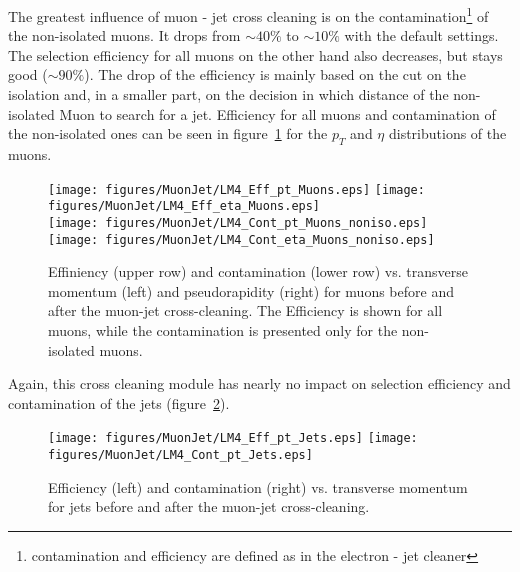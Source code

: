 \documentclass{cmspaper}
\begin{document}
The greatest influence of muon - jet cross cleaning is on the contamination\footnote{contamination and efficiency are defined as in the electron - jet cleaner} of
the non-isolated muons. It drops from \(\sim 40 \%\) to \(\sim 10 \%\) with the default settings. The
selection efficiency for all muons on the other hand also decreases, but stays good (\(\sim
90\%\)). The drop of the efficiency is mainly based on the cut on the isolation and, in a smaller part, on the decision in which distance of the non-isolated Muon to search for a jet. Efficiency for all muons and contamination of the non-isolated ones can be seen in figure~\ref{fig:effCont_muon_MuonJet} for the \(p_T\)
and \(\eta\) distributions of the muons. 

\begin{figure}[hb]
\begin{center}
    \texttt{[image: figures/MuonJet/LM4\_Eff\_pt\_Muons.eps]}
    \texttt{[image: figures/MuonJet/LM4\_Eff\_eta\_Muons.eps]}\\
    \texttt{[image: figures/MuonJet/LM4\_Cont\_pt\_Muons\_noniso.eps]}
    \texttt{[image: figures/MuonJet/LM4\_Cont\_eta\_Muons\_noniso.eps]}
    \caption{Effiniency (upper row) and contamination (lower row) vs. transverse
    momentum (left) and pseudorapidity (right) for muons before and after the
    muon-jet cross-cleaning. The Efficiency is shown for all muons, while the contamination is presented only for the non-isolated muons.}
\label{fig:effCont_muon_MuonJet}
\end{center}
\end{figure}

Again, this cross cleaning module has nearly no impact on selection efficiency
and contamination of the jets (figure~\ref{fig:effCont_Jets_MuonJet}).

\begin{figure}[hb]
\begin{center}
    \texttt{[image: figures/MuonJet/LM4\_Eff\_pt\_Jets.eps]}
    \texttt{[image: figures/MuonJet/LM4\_Cont\_pt\_Jets.eps]}
    \caption{Efficiency (left) and contamination (right) vs. transverse momentum
    for jets before and after the muon-jet cross-cleaning.}
\label{fig:effCont_Jets_MuonJet}
\end{center}
\end{figure}
\end{document}
